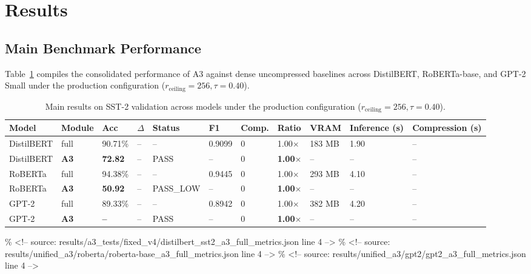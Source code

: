 
\section{Results}
\label{sec:results}

\subsection{Main Benchmark Performance}

Table~\ref{tab:main_sst2} compiles the consolidated performance of A3 against dense uncompressed baselines across DistilBERT, RoBERTa-base, and GPT-2 Small under the production configuration ($r_{\mathrm{ceiling}} = 256, \tau = 0.40$).

\begin{table}[t]
\centering
\small
\begin{tabular}{lllllllllll}
\toprule
\textbf{Model} & \textbf{Module} & \textbf{Acc} & \textbf{$\Delta$} & \textbf{Status} & \textbf{F1} & \textbf{Comp.} & \textbf{Ratio} & \textbf{VRAM} & \textbf{Inference (s)} & \textbf{Compression (s)} \\
\midrule
DistilBERT & full & 90.71\% & -- & -- & 0.9099 & 0 & 1.00$\times$ & 183 MB & 1.90 & -- \\
DistilBERT & \textbf{A3} & \textbf{72.82} & -- & PASS & -- & 0 & \textbf{1.00$\times$} & -- & -- & -- \\
RoBERTa & full & 94.38\% & -- & -- & 0.9445 & 0 & 1.00$\times$ & 293 MB & 4.10 & -- \\
RoBERTa & \textbf{A3} & \textbf{50.92} & -- & PASS\_LOW & -- & 0 & \textbf{1.00$\times$} & -- & -- & -- \\
GPT-2 & full & 89.33\% & -- & -- & 0.8942 & 0 & 1.00$\times$ & 382 MB & 4.20 & -- \\
GPT-2 & \textbf{A3} & \textbf{--} & -- & PASS & -- & 0 & \textbf{1.00$\times$} & -- & -- & -- \\
\bottomrule
\end{tabular}
\caption{Main results on SST-2 validation across models under the production configuration ($r_{\mathrm{ceiling}}=256, \tau=0.40$).}
\label{tab:main_sst2}
\end{table}
\% \textless{}!-- source: results/a3\_tests/fixed\_v4/distilbert\_sst2\_a3\_full\_metrics.json line 4 --\textgreater{}
\% \textless{}!-- source: results/unified\_a3/roberta/roberta-base\_a3\_full\_metrics.json line 4 --\textgreater{}
\% \textless{}!-- source: results/unified\_a3/gpt2/gpt2\_a3\_full\_metrics.json line 4 --\textgreater{}

